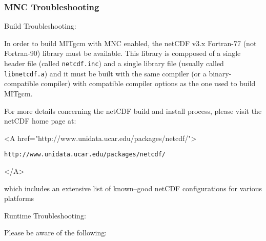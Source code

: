 \subsubsection{MNC Troubleshooting}

Build Troubleshooting:

In order to build MITgcm with MNC enabled, the netCDF v3.x Fortran-77
(not Fortran-90) library must be available.  This library is compposed
of a single header file (called \texttt{netcdf.inc}) and a single
library file (usually called \texttt{libnetcdf.a}) and it must be
built with the same compiler (or a binary-compatible compiler) with
compatible compiler options as the one used to build MITgcm.

For more details concerning the netCDF build and install process,
please visit the netCDF home page at:
\begin{rawhtml} <A href="http://www.unidata.ucar.edu/packages/netcdf/"> \end{rawhtml}
\begin{verbatim}
http://www.unidata.ucar.edu/packages/netcdf/
\end{verbatim}
\begin{rawhtml} </A> \end{rawhtml} 
which includes an extensive list of known--good netCDF configurations
for various platforms

Runtime Troubleshooting:

Please be aware of the following:


